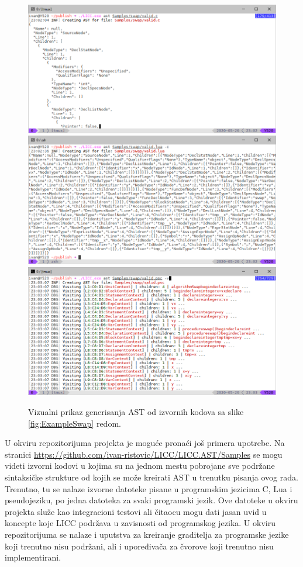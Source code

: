 \begin{figure}[h!]
\centering
\includegraphics[scale=0.56]{images/eval/ast_c.png}
\includegraphics[scale=0.56]{images/eval/ast_lua.png}
\includegraphics[scale=0.56]{images/eval/ast_psc.png}
\caption{Vizualni prikaz generisanja AST od izvornih kodova sa slike \ref{fig:ExampleSwap} redom.}
\label{fig:ExampleSwapAST}
\end{figure}

U okviru repozitorijuma projekta je moguće pronaći još primera upotrebe. Na stranici \url{https://github.com/ivan-ristovic/LICC/LICC.AST/Samples} se mogu videti izvorni kodovi u kojima su na jednom mestu pobrojane sve podržane sintaksičke strukture od kojih se može kreirati AST u trenutku pisanja ovog rada. Trenutno, tu se nalaze izvorne datoteke pisane u programskim jezicima C, Lua i pseudojeziku, po jedna datoteka za svaki programski jezik. Ove datoteke u okviru projekta služe kao integracioni testovi ali čitaocu mogu dati jasan uvid u koncepte koje LICC podržava u zavisnosti od programskog jezika. U okviru repozitorijuma se nalaze i uputstva za kreiranje graditelja za programske jezike koji trenutno nisu podržani, ali i upoređivača za čvorove koji trenutno nisu implementirani.


